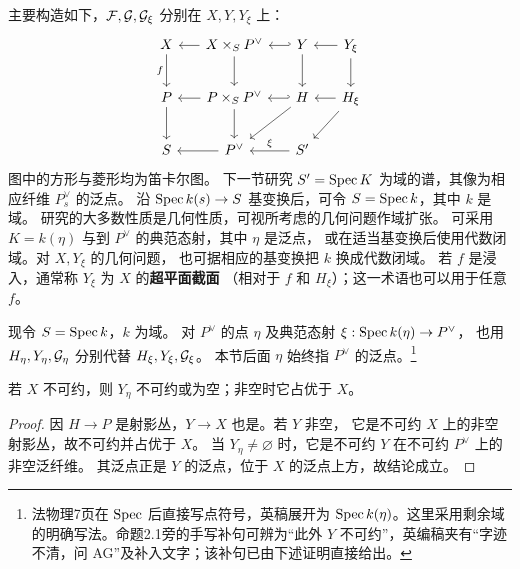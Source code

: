 主要构造如下，\(\mathcal F,\mathcal G,\mathcal G_\xi\) 分别在 \(X,Y,Y_\xi\) 上：
\[
\begin{tikzcd}[column sep=1.5em,row sep=2em]
X\arrow[d,"f"'] & X\times_S P^\vee\arrow[l]\arrow[d]
   &Y\arrow[l,hook']\arrow[d]&Y_\xi\arrow[l]\arrow[d]\\
P\arrow[d] & P\times_S P^\vee\arrow[l]\arrow[d]
   &H\arrow[l,hook']\arrow[dl]&H_\xi\arrow[l]\arrow[dl]\\
S & P^\vee\arrow[l]& S'\arrow[l,"\xi"']&
\end{tikzcd}
\]
图中的方形与菱形均为笛卡尔图。
下一节研究 \(S'=\operatorname{Spec} K\) 为域的谱，其像为相应纤维 \(P_s^\vee\) 的泛点。
沿 \(\operatorname{Spec} k(s)\to S\) 基变换后，可令 \(S=\operatorname{Spec} k\)，其中 \(k\) 是域。
研究的大多数性质是几何性质，可视所考虑的几何问题作域扩张。
可采用 \(K=k(\eta)\) 与到 \(P^\vee\) 的典范态射，其中 \(\eta\) 是泛点，
或在适当基变换后使用代数闭域。对 \(X,Y_\xi\) 的几何问题，
也可据相应的基变换把 \(k\) 换成代数闭域。
若 \(f\) 是浸入，通常称 \(Y_\xi\) 为 \(X\) 的\textbf{超平面截面}
（相对于 \(f\) 和 \(H_\xi\)）；这一术语也可以用于任意 \(f\)。


现令 \(S=\operatorname{Spec} k\)，\(k\) 为域。
对 \(P^\vee\) 的点 \(\eta\) 及典范态射 \(\xi:\operatorname{Spec} k(\eta)\to P^\vee\)，
也用 \(H_\eta,Y_\eta,\mathcal G_\eta\) 分别代替 \(H_\xi,Y_\xi,\mathcal G_\xi\)。
本节后面 \(\eta\) 始终指 \(P^\vee\) 的泛点。\footnote{法物理7页在 \(\operatorname{Spec}\) 后直接写点符号，英稿展开为 \(\operatorname{Spec} k(\eta)\)。这里采用剩余域的明确写法。命题2.1旁的手写补句可辨为“此外 \(Y\) 不可约”，英编稿夹有“字迹不清，问 AG”及补入文字；该补句已由下述证明直接给出。}

若 \(X\) 不可约，则 \(Y_\eta\) 不可约或为空；非空时它占优于 \(X\)。
\begin{proof}
因 \(H\to P\) 是射影丛，\(Y\to X\) 也是。若 \(Y\) 非空，
它是不可约 \(X\) 上的非空射影丛，故不可约并占优于 \(X\)。
当 \(Y_\eta\ne\varnothing\) 时，它是不可约 \(Y\) 在不可约 \(P^\vee\) 上的非空泛纤维。
其泛点正是 \(Y\) 的泛点，位于 \(X\) 的泛点上方，故结论成立。
\end{proof}

